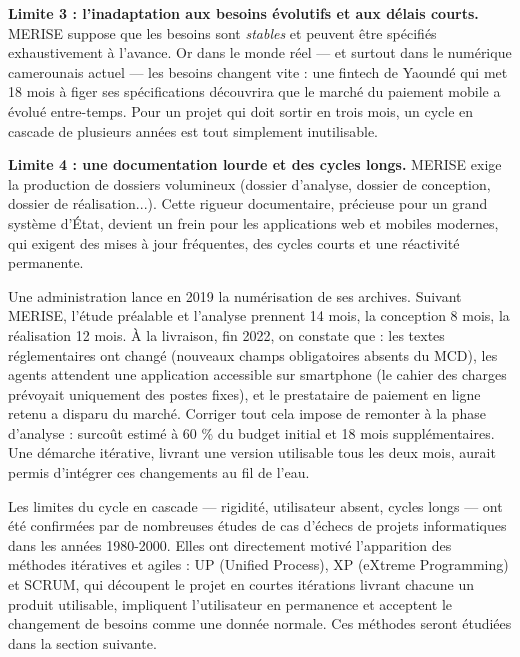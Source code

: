 \documentclass[11pt]{article}
\newcommand{\cle}[1]{{\popxbold\color{popdark}#1}}
\begin{document}
\textbf{Limite 3 : l'inadaptation aux besoins évolutifs et aux délais courts.} MERISE suppose que les besoins sont \emph{stables} et peuvent être spécifiés exhaustivement à l'avance. Or dans le monde réel — et surtout dans le numérique camerounais actuel — les besoins changent vite : une fintech de Yaoundé qui met 18 mois à figer ses spécifications découvrira que le marché du paiement mobile a évolué entre-temps. Pour un projet qui doit sortir en trois mois, un cycle en cascade de plusieurs années est tout simplement inutilisable.

\textbf{Limite 4 : une documentation lourde et des cycles longs.} MERISE exige la production de dossiers volumineux (dossier d'analyse, dossier de conception, dossier de réalisation...). Cette rigueur documentaire, précieuse pour un grand système d'État, devient un frein pour les applications \cle{web} et \cle{mobiles} modernes, qui exigent des mises à jour fréquentes, des cycles courts et une réactivité permanente.

\begin{exemplebox}
Une administration lance en 2019 la numérisation de ses archives. Suivant MERISE, l'étude préalable et l'analyse prennent 14 mois, la conception 8 mois, la réalisation 12 mois. À la livraison, fin 2022, on constate que : les textes réglementaires ont changé (nouveaux champs obligatoires absents du MCD), les agents attendent une application accessible sur smartphone (le cahier des charges prévoyait uniquement des postes fixes), et le prestataire de paiement en ligne retenu a disparu du marché. Corriger tout cela impose de remonter à la phase d'analyse : surcoût estimé à 60 \% du budget initial et 18 mois supplémentaires. Une démarche itérative, livrant une version utilisable tous les deux mois, aurait permis d'intégrer ces changements au fil de l'eau.
\end{exemplebox}

\begin{propriete}
Les limites du cycle en cascade — rigidité, utilisateur absent, cycles longs — ont été confirmées par de nombreuses études de cas d'échecs de projets informatiques dans les années 1980-2000. Elles ont directement motivé l'apparition des méthodes \cle{itératives} et \cle{agiles} : \cle{UP} (Unified Process), \cle{XP} (eXtreme Programming) et \cle{SCRUM}, qui découpent le projet en courtes itérations livrant chacune un produit utilisable, impliquent l'utilisateur en permanence et acceptent le changement de besoins comme une donnée normale. Ces méthodes seront étudiées dans la section suivante.
\end{propriete}
\end{document}
